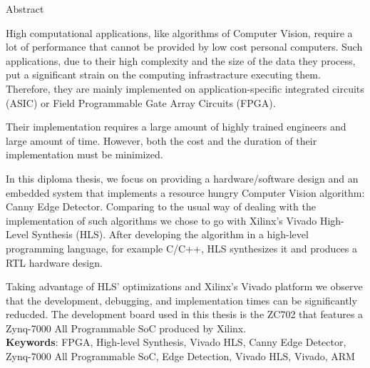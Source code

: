 \pagestyle{plain}

\begin{center}
{\LARGE Abstract}\\[1cm]
\end{center}


High computational applications, like algorithms of Computer Vision, require a lot of performance that cannot be provided by low cost personal computers. Such applications, due to their high complexity and the size of the data they process, put a significant strain on the computing infrastracture executing them. Therefore, they are mainly implemented on application-specific integrated circuits (ASIC) or Field Programmable Gate Array Circuits (FPGA).

Their implementation requires a large amount of highly trained engineers and large amount of time. However, both the cost and the duration of their implementation must be minimized.

In this diploma thesis, we focus on providing a hardware/software design and an embedded system that implements a resource hungry Computer Vision algorithm: Canny Edge Detector. Comparing to the usual way of dealing with the implementation of such algorithms we chose to go with Xilinx's Vivado High-Level Synthesis (HLS). After developing the algorithm in a high-level programming language, for example C/C++, HLS synthesizes it and produces a RTL hardware design.

Taking advantage of HLS' optimizations and Xilinx's Vivado platform we observe that the development, debugging, and implementation times can be significantly reducded. The development board used in this thesis is the ZC702 that features a Zynq-7000 All Programmable SoC produced by Xilinx.\\

\noindent
\textbf{Keywords}: FPGA, High-level Synthesis, Vivado HLS, Canny Edge Detector, Zynq-7000 All Programmable SoC, Edge Detection, Vivado HLS, Vivado, ARM